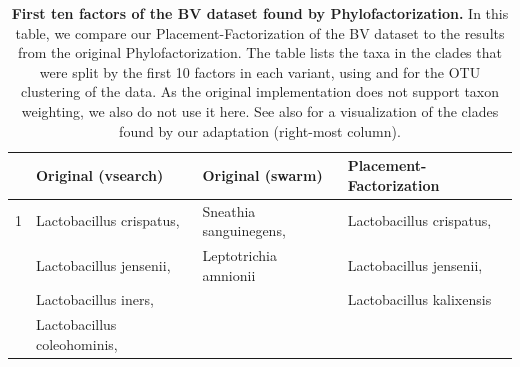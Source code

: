\begin{table}[!tbp]
\caption[First ten factors of the \ac{BV} dataset found by Phylofactorization]{
\textbf{First ten factors of the \ac{BV} dataset found by Phylofactorization.}
In this table, we compare our Placement-Factorization of the \ac{BV} dataset
to the results from the original Phylofactorization.
The table lists the taxa in the clades that were split by the first \num{10} factors in each variant,
using  and  for the OTU clustering of the data.
As the original implementation does not support taxon weighting, we also do not use it here.
See also  for a visualization of the clades found by our adaptation (right-most column).
%
}
\label{tab:bv_phylofactor_clades}
{
    \newcommand{\rc}{\rowcolor{black!12}}
    \small
    \begin{center}
    \begin{tabular}{rlll}
        \toprule
             &  Original (vsearch)          & Original (swarm)        & Placement-Factorization   \\
        \midrule
\rc{}   1    & Lactobacillus crispatus,     & Sneathia sanguinegens,  & Lactobacillus crispatus,   \\
\rc{}        & Lactobacillus jensenii,      & Leptotrichia amnionii   & Lactobacillus jensenii,    \\
\rc{}        & Lactobacillus iners,         &                         & Lactobacillus kalixensis   \\
\rc{}        & Lactobacillus coleohominis,  &                         &     \\

\end{tabular}
\end{center}}
\end{table}
